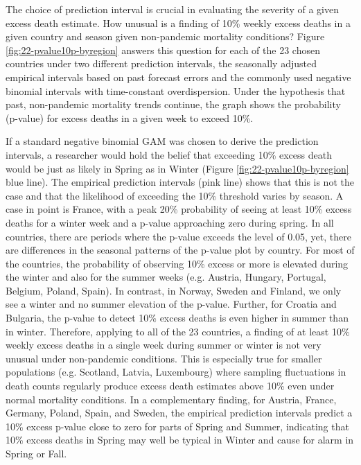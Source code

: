 \documentclass[12pt]{article}
\begin{document}
The choice of prediction interval is crucial in evaluating the severity of a given excess death estimate. How unusual is a finding of 10\% weekly excess deaths in a given country and season given non-pandemic mortality conditions? Figure \ref{fig:22-pvalue10p-byregion} answers this question for each of the 23 chosen countries under two different prediction intervals, the seasonally adjusted empirical intervals based on past forecast errors and the commonly used negative binomial intervals with time-constant overdispersion. Under the hypothesis that past, non-pandemic mortality trends continue, the graph shows the probability (p-value) for excess deaths in a given week to exceed 10\%.

If a standard negative binomial GAM was chosen to derive the prediction intervals, a researcher would hold the belief that exceeding 10\% excess death would be just as likely in Spring as in Winter (Figure \ref{fig:22-pvalue10p-byregion} blue line). The empirical prediction intervals (pink line) shows that this is not the case and that the likelihood of exceeding the 10\% threshold varies by season. A case in point is France, with a peak 20\% probability of seeing at least 10\% excess deaths for a winter week and a p-value approaching zero during spring. In all countries, there are periods where the p-value exceeds the level of 0.05, yet, there are differences in the seasonal patterns of the p-value plot by country. For most of the countries, the probability of observing 10\% excess or more is elevated during the winter and also for the summer weeks (e.g. Austria, Hungary, Portugal, Belgium, Poland, Spain). In contrast, in Norway, Sweden and Finland, we only see a winter and no summer elevation of the p-value. Further, for Croatia and Bulgaria, the p-value to detect 10\% excess deaths is even higher in summer than in winter. Therefore, applying to all of the 23 countries, a finding of at least 10\% weekly excess deaths in a single week during summer or winter is not very unusual under non-pandemic conditions. This is especially true for smaller populations (e.g. Scotland, Latvia, Luxembourg) where sampling fluctuations in death counts regularly produce excess death estimates above 10\% even under normal mortality conditions. In a complementary finding, for Austria, France, Germany, Poland, Spain, and Sweden, the empirical prediction intervals predict a 10\% excess p-value close to zero for parts of Spring and Summer, indicating that 10\% excess deaths in Spring may well be typical in Winter and cause for alarm in Spring or Fall.
\end{document}
